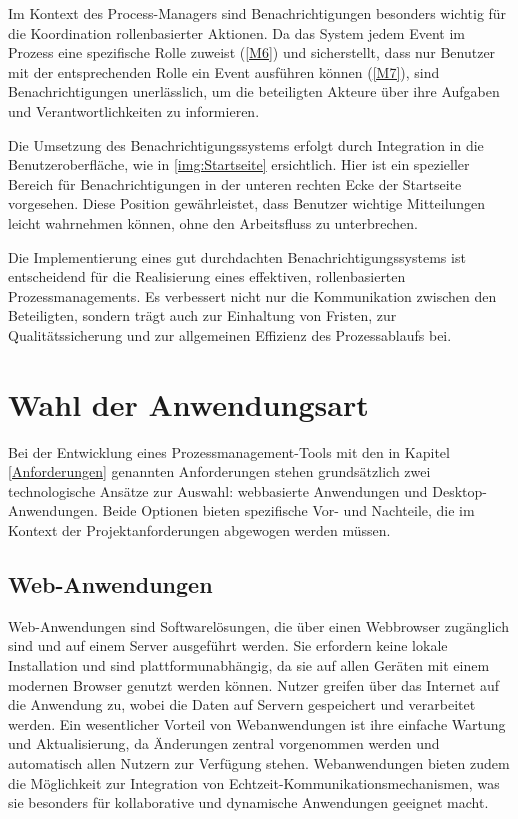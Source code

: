 Im Kontext des Process-Managers sind Benachrichtigungen besonders wichtig für die Koordination rollenbasierter Aktionen. Da das System jedem Event im Prozess eine spezifische Rolle zuweist (\ref{M6}) und sicherstellt, dass nur Benutzer mit der entsprechenden Rolle ein Event ausführen können (\ref{M7}), sind Benachrichtigungen unerlässlich, um die beteiligten Akteure über ihre Aufgaben und Verantwortlichkeiten zu informieren. \cite[Vgl.][]{Magicbell} \cite[Vgl.][]{Skillable}

Die Umsetzung des Benachrichtigungssystems erfolgt durch Integration in die Benutzeroberfläche, wie in \autoref{img:Startseite} ersichtlich. Hier ist ein spezieller Bereich für Benachrichtigungen in der unteren rechten Ecke der Startseite vorgesehen. Diese Position gewährleistet, dass Benutzer wichtige Mitteilungen leicht wahrnehmen können, ohne den Arbeitsfluss zu unterbrechen.

Die Implementierung eines gut durchdachten Benachrichtigungssystems ist entscheidend für die Realisierung eines effektiven, rollenbasierten Prozessmanagements. Es verbessert nicht nur die Kommunikation zwischen den Beteiligten, sondern trägt auch zur Einhaltung von Fristen, zur Qualitätssicherung und zur allgemeinen Effizienz des Prozessablaufs bei.

\newpage
\section{Wahl der Anwendungsart}
Bei der Entwicklung eines Prozessmanagement-Tools mit den in Kapitel \ref{Anforderungen} genannten Anforderungen stehen grundsätzlich zwei technologische Ansätze zur Auswahl: webbasierte Anwendungen und Desktop-Anwendungen. Beide Optionen bieten spezifische Vor- und Nachteile, die im Kontext der Projektanforderungen abgewogen werden müssen.  

\subsection*{Web-Anwendungen}
Web-Anwendungen sind Softwarelösungen, die über einen Webbrowser zugänglich sind und auf einem Server ausgeführt werden. Sie erfordern keine lokale Installation und sind plattformunabhängig, da sie auf allen Geräten mit einem modernen Browser genutzt werden können. Nutzer greifen über das Internet auf die Anwendung zu, wobei die Daten auf Servern gespeichert und verarbeitet werden. Ein wesentlicher Vorteil von Webanwendungen ist ihre einfache Wartung und Aktualisierung, da Änderungen zentral vorgenommen werden und automatisch allen Nutzern zur Verfügung stehen. Webanwendungen bieten zudem die Möglichkeit zur Integration von Echtzeit-Kommunikationsmechanismen, was sie besonders für kollaborative und dynamische Anwendungen geeignet macht.

